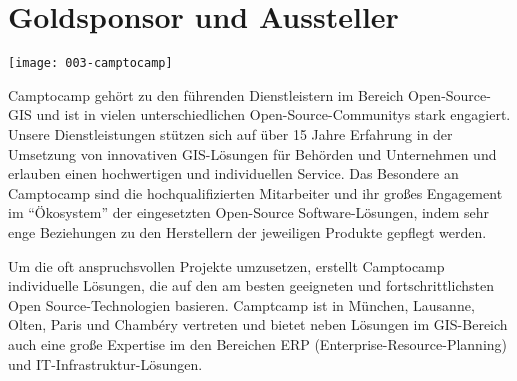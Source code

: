 \section*{Goldsponsor und Aussteller}
\begin{center}
  \texttt{[image: 003-camptocamp]}
\end{center}
Camptocamp gehört zu den führenden Dienstleistern im Bereich Open-Source-GIS
und ist in vielen unterschiedlichen Open-Source-Communitys stark engagiert.
Unsere Dienstleistungen stützen sich auf über 15 Jahre Erfahrung in der
Umsetzung von innovativen GIS-Lösungen für Behörden und Unternehmen und
erlauben einen hochwertigen und individuellen Service. Das Besondere an
Camptocamp sind die hochqualifizierten Mitarbeiter und ihr großes Engagement im
"`Ökosystem"' der eingesetzten Open-Source Software-Lösungen, indem sehr enge
Beziehungen zu den Herstellern der jeweiligen Produkte gepflegt werden.

Um die oft anspruchsvollen Projekte umzusetzen, erstellt Camptocamp
individuelle Lösungen, die auf den am besten geeigneten und fortschrittlichsten
Open Source-Technologien basieren. Camptcamp ist in München, Lausanne, Olten,
Paris und Chambéry vertreten und bietet neben Lösungen im GIS-Bereich auch eine
große Expertise im den Bereichen ERP (Enterprise-Resource-Planning) und
IT-Infrastruktur-Lösungen.
